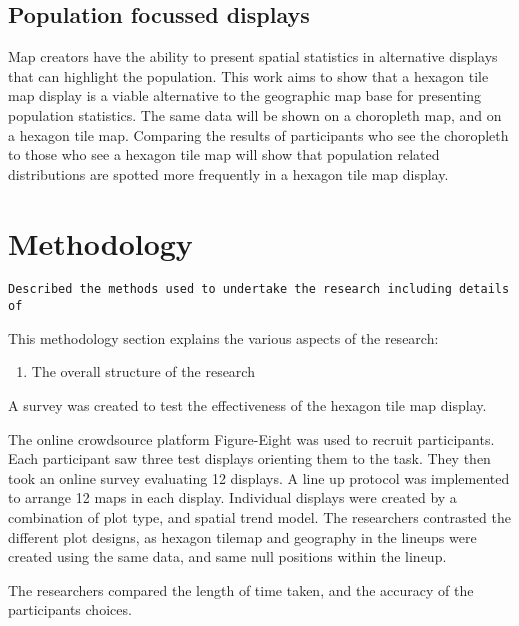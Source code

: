 \documentclass[conference,final,]{IEEEtran}
\providecommand{\tightlist}{%
  \setlength{\itemsep}{0pt}\setlength{\parskip}{0pt}}
\begin{document}
\hypertarget{population-focussed-displays}{%
\subsection{Population focussed
displays}\label{population-focussed-displays}}

Map creators have the ability to present spatial statistics in
alternative displays that can highlight the population. This work aims
to show that a hexagon tile map display is a viable alternative to the
geographic map base for presenting population statistics. The same data
will be shown on a choropleth map, and on a hexagon tile map. Comparing
the results of participants who see the choropleth to those who see a
hexagon tile map will show that population related distributions are
spotted more frequently in a hexagon tile map display.

\hypertarget{methodology}{%
\section{Methodology}\label{methodology}}

\begin{verbatim}
Described the methods used to undertake the research including details of 
\end{verbatim}

This methodology section explains the various aspects of the research:

\begin{enumerate}
\def\labelenumi{\arabic{enumi}.}
\tightlist
\item
  The overall structure of the research
\end{enumerate}

A survey was created to test the effectiveness of the hexagon tile map
display.

The online crowdsource platform Figure-Eight was used to recruit
participants.\\
Each participant saw three test displays orienting them to the task.
They then took an online survey evaluating 12 displays. A line up
protocol was implemented to arrange 12 maps in each display. Individual
displays were created by a combination of plot type, and spatial trend
model. The researchers contrasted the different plot designs, as hexagon
tilemap and geography in the lineups were created using the same data,
and same null positions within the lineup.

The researchers compared the length of time taken, and the accuracy of
the participants choices.
\end{document}
